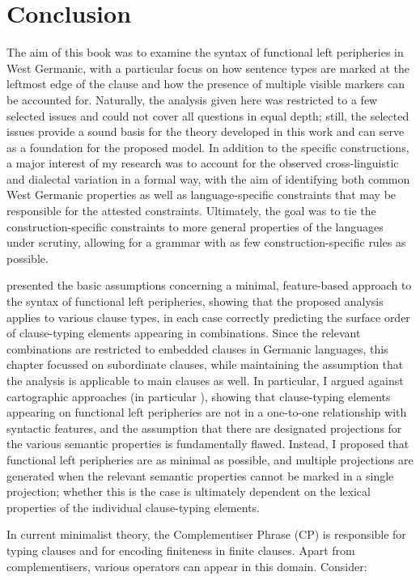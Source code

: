 \chapter{Conclusion} \label{ch:7}
The aim of this book was to examine the syntax of functional left peripheries in West Germanic, with a particular focus on how sentence types are marked at the leftmost edge of the clause and how the presence of multiple visible markers can be accounted for. Naturally, the analysis given here was restricted to a few selected issues and could not cover all questions in equal depth; still, the selected issues provide a sound basis for the theory developed in this work and can serve as a foundation for the proposed model. In addition to the specific constructions, a major interest of my research was to account for the observed cross-linguistic and dialectal variation in a formal way, with the aim of identifying both common West Germanic properties as well as language-specific constraints that may be responsible for the attested constraints. Ultimately, the goal was to tie the construction-specific constraints to more general properties of the languages under scrutiny, allowing for a grammar with as few construction-specific rules as possible.

 presented the basic assumptions concerning a minimal, feature-based approach to the syntax of functional left peripheries, showing that the proposed analysis applies to various clause types, in each case correctly predicting the surface order of clause-typing elements appearing in combinations. Since the relevant combinations are restricted to embedded clauses in Germanic languages, this chapter focussed on subordinate clauses, while maintaining the assumption that the analysis is applicable to main clauses as well. In particular, I argued against cartographic approaches (in particular \citealt{rizzi1997, rizzi2004}), showing that clause-typing elements appearing on functional left peripheries are not in a one-to-one relationship with syntactic features, and the assumption that there are designated projections for the various semantic properties is fundamentally flawed. Instead, I proposed that functional left peripheries are as minimal as possible, and multiple projections are generated when the relevant semantic properties cannot be marked in a single projection; whether this is the case is ultimately dependent on the lexical properties of the individual clause-typing elements.

In current minimalist theory, the Complementiser Phrase (CP) is responsible for typing clauses and for encoding finiteness in finite clauses. Apart from complementisers, various operators can appear in this domain. Consider:

